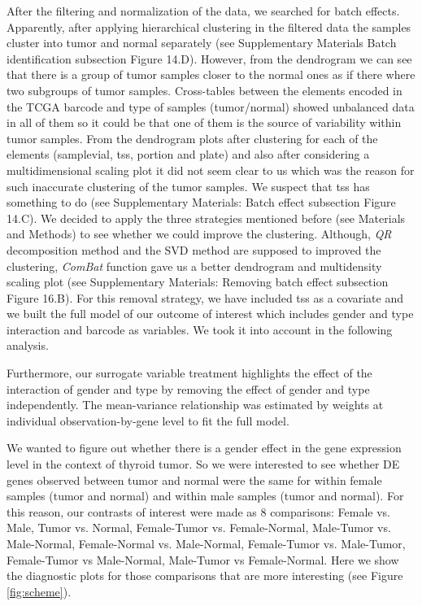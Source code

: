 \documentclass[9pt,twocolumn,twoside]{gsajnl}
\begin{document}
After the filtering and normalization of the data, we searched for batch effects. Apparently, after applying hierarchical clustering in the filtered data the samples cluster into tumor and normal separately (see Supplementary Materials Batch identification subsection Figure 14.D). However, from the dendrogram we can see that there is a group of tumor samples closer to the normal ones as if there where two subgroups of tumor samples. Cross-tables between the elements encoded in the TCGA barcode and type of samples (tumor/normal) showed unbalanced data in all of them so it could be that one of them is the source of variability within tumor samples. From the dendrogram plots after clustering for each of the elements (samplevial, tss, portion and plate) and also after considering a multidimensional scaling plot it did not seem clear to us which was the reason for such inaccurate clustering of the tumor samples. We suspect that tss has something to do (see Supplementary Materials: Batch effect subsection Figure 14.C). We decided to apply the three strategies mentioned before (see Materials and Methods) to see whether we could improve the clustering. Although, \textit{QR} decomposition method and the SVD method are supposed to improved the clustering, \textit{ComBat} function gave us a better dendrogram and multidensity scaling plot (see Supplementary Materials: Removing batch effect subsection Figure 16.B). For this removal strategy, we have included tss as a covariate and we built the full model of our outcome of interest which includes gender and type interaction and barcode as variables. We took it into account in the following analysis.

Furthermore, our surrogate variable treatment highlights the effect of the interaction of gender and type by removing the effect of gender and type independently. The mean-variance relationship was estimated by weights at individual observation-by-gene level to fit the full model.  

We wanted to figure out whether there is a gender effect in the gene expression level in the context of thyroid tumor. So we were interested to see whether DE genes observed between tumor and normal were the same for within female samples (tumor  and normal) and within male samples (tumor and normal). For this reason, our contrasts of interest were made as 8 comparisons: 
Female vs. Male, Tumor vs. Normal, Female-Tumor vs. Female-Normal,  Male-Tumor vs. Male-Normal, Female-Normal vs. Male-Normal, Female-Tumor vs. Male-Tumor, Female-Tumor vs Male-Normal, Male-Tumor vs Female-Normal. Here we show the diagnostic plots for those comparisons that are more interesting (see Figure \ref{fig:scheme}).
\end{document}
